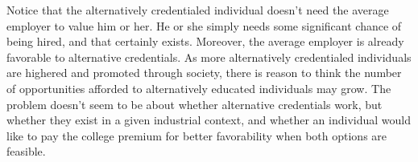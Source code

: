\documentclass[review]{elsarticle}
\begin{document}
Notice that the alternatively credentialed individual doesn't need the average employer to value him or her.
He or she simply needs some significant chance of being hired, and that certainly exists.
Moreover, the average employer is already favorable to alternative credentials.
As more alternatively credentialed individuals are highered and promoted through society,
there is reason to think the number of opportunities afforded to alternatively educated individuals may grow.
The problem doesn't seem to be about whether alternative credentials work, but whether they exist in a given industrial context,
and whether an individual would like to pay the college premium for better favorability when both options are feasible.


\end{document}
